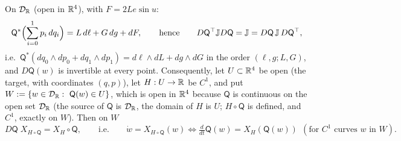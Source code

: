 \begin{proposition}\label{bpI:p7:symplectic}
On $\mathcal D_{\mathbb{R}}$ (open in $\mathbb{R}^4$), with $F=2Le\sin u$:
\[
\mathsf Q^*\Bigl(\sum_{i=0}^{1}p_i\,dq_i\Bigr)=L\,d\ell+G\,dg+dF,\qquad\text{hence}\qquad D\mathsf Q^{\top}\mathbb JD\mathsf Q=\mathbb J=D\mathsf Q\,\mathbb J\,D\mathsf Q^{\top},
\]
i.e.\ $\mathsf Q^*(dq_0\wedge dp_0+dq_1\wedge dp_1)=d\ell\wedge dL+dg\wedge dG$ in the order $(\ell,g;L,G)$, and $D\mathsf Q(w)$ is invertible at every point. Consequently, let $U\subset\mathbb{R}^4$ be open (the target, with coordinates $(q,p)$), let $H:U\to\mathbb{R}$ be $C^1$, and put
$W:=\{w\in\mathcal D_{\mathbb{R}}:\ \mathsf Q(w)\in U\}$, which is open in $\mathbb{R}^4$ because $\mathsf Q$ is continuous on the open set $\mathcal D_{\mathbb{R}}$
(the source of $\mathsf Q$ is $\mathcal D_{\mathbb{R}}$, the domain of $H$ is $U$; $H\circ\mathsf Q$ is defined, and $C^1$, exactly on $W$). Then on $W$
\[
D\mathsf Q\;X_{H\circ\mathsf Q}=X_H\circ\mathsf Q,\qquad\text{i.e.}\qquad \dot w=X_{H\circ\mathsf Q}(w)\iff\tfrac{d}{dt}\mathsf Q(w)=X_H(\mathsf Q(w))\ \ (\text{for }C^1\text{ curves }w\text{ in }W).
\]
\end{proposition}
